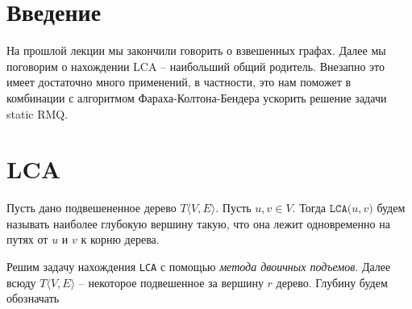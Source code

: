 \section{Введение}

На прошлой лекции мы закончили говорить о взвешенных графах.
Далее мы поговорим о нахождении LCA -- наибольший общий родитель.
Внезапно это имеет достаточно много применений, в частности, это нам поможет в комбинации с алгоритмом Фараха-Колтона-Бендера ускорить решение задачи static RMQ.

\section{LCA}

\Def Пусть дано подвешененное дерево $T \langle V, E \rangle$. Пусть $u, v \in V$.
Тогда $\texttt{LCA(}u, v\texttt{)}$ будем называть наиболее глубокую вершину такую, что она лежит одновременно на путях от $u$ и $v$ к корню дерева.

Решим задачу нахождения \texttt{LCA} с помощью \textit{метода двоичных подъемов}. Далее всюду $T\langle V, E\rangle$ -- некоторое подвешенное за вершину $r$ дерево.
Глубину будем обозначать 

